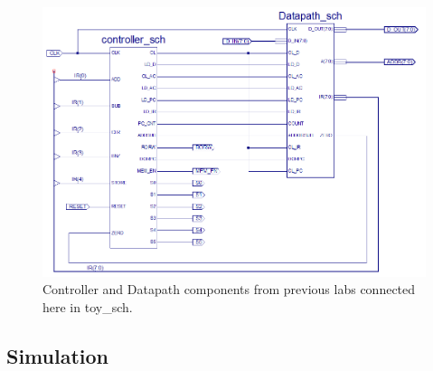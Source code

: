 \documentclass[12pt]{article}
\begin{document}
		\begin{figure}[h]
			\includegraphics[scale=.6]{toy_sch.PNG}
			\caption{Controller and Datapath components from previous labs connected here in toy\_sch.}
		\end{figure}
		
		\newpage
	\subsection{Simulation}
		
\end{document}
